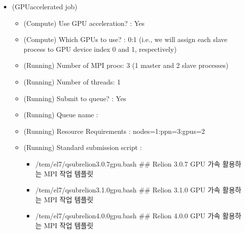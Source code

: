 \documentclass[a4paper,11pt,english]{sphinxmanual}
\begin{document}

\begin{itemize}
\item {} 
\sphinxAtStartPar
{} (GPU\sphinxhyphen{}accelerated job)
\begin{itemize}
\item {} 
\sphinxAtStartPar
(Compute) Use GPU acceleration? : Yes

\item {} 
\sphinxAtStartPar
(Compute) Which GPUs to use? : 0:1 (i.e., we will assign each slave process to GPU device index 0 and 1, respectively)

\item {} 
\sphinxAtStartPar
(Running) Number of MPI procs: 3 (1 master and 2 slave processes)

\item {} 
\sphinxAtStartPar
(Running) Number of threads: 1

\item {} 
\sphinxAtStartPar
(Running) Submit to queue? : Yes

\item {} 
\sphinxAtStartPar
(Running) Queue name : 

\item {} 
\sphinxAtStartPar
(Running) Resource Requirements : nodes=1:ppn=3:gpus=2

\item {} 
\sphinxAtStartPar
(Running) Standard submission script :
\begin{itemize}
\item {} 
\sphinxAtStartPar
/tem/el7/qsub\sphinxhyphen{}relion\sphinxhyphen{}3.0.7\sphinxhyphen{}gpu.bash           \#\# Relion 3.0.7 GPU 가속 활용하는 MPI 작업 템플릿

\item {} 
\sphinxAtStartPar
/tem/el7/qsub\sphinxhyphen{}relion\sphinxhyphen{}3.1.0\sphinxhyphen{}gpu.bash           \#\# Relion 3.1.0 GPU 가속 활용하는 MPI 작업 템플릿

\item {} 
\sphinxAtStartPar
/tem/el7/qsub\sphinxhyphen{}relion\sphinxhyphen{}4.0.0\sphinxhyphen{}gpu.bash           \#\# Relion 4.0.0 GPU 가속 활용하는 MPI 작업 템플릿

\end{itemize}

\end{itemize}

\end{itemize}
\end{document}
